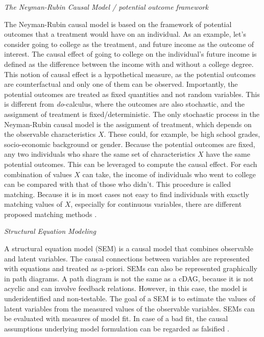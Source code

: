 \documentclass[nobib]{tufte-handout}
\newcommand{\docalc}{\emph{do}-calculus\xspace}
\begin{document}
\begin{InfoBox}
\centering
\colorbox{mygray}{
  \centering
  \begin{minipage}{1\textwidth}
    \medskip
    
    \emph{The Neyman-Rubin Causal Model / potential outcome framework}
    \medskip
    
    The Neyman-Rubin causal model is based on the framework of potential outcomes that a treatment would have on an individual. 
    As an example, let's consider going to college as the treatment, and future income as the outcome of interest. 
    The causal effect of going to college on the individual's future income is defined as the difference between the income with and without a college degree. 
    This notion of causal effect is a hypothetical measure, as the potential outcomes are counterfactual and only one of them can be observed.
    Importantly, the potential outcomes are treated as fixed quantities and not random variables.
    This is different from \docalc, where the outcomes are also stochastic, and the assignment of treatment is fixed/deterministic.
    The only stochastic process in the Neyman-Rubin causal model is the assignment of treatment, which depends on the observable characteristics $X$.
    These could, for example, be high school grades, socio-economic background or gender.
    Because the potential outcomes are fixed, any two individuals who share the same set of characteristics $X$ have the same potential outcomes. 
    This can be leveraged to compute the causal effect.
    For each combination of values $X$ can take, the income of individuals who went to college can be compared with that of those who didn't. 
    This procedure is called matching. 
    Because it is in most cases not easy to find individuals with exactly matching values of $X$, especially for continuous variables, there are different proposed matching methods \citep{sekhon2008neyman}.
   
    \medskip

    \emph{Structural Equation Modeling}
    \medskip

    A structural equation model (SEM) is a causal model that combines observable and latent variables.
    The causal connections between variables are represented with equations and treated as a-priori.
    SEMs can also be represented graphically in path diagrams.
    A path diagram is not the same as a cDAG, because it is not acyclic and can involve feedback relations. However, in this case, the model is underidentified and non-testable.
    The goal of a SEM is to estimate the values of latent variables from the measured values of the observable variables. 
    SEMs can be evaluated with measures of model fit. 
    In case of a bad fit, the causal assumptions underlying model formulation can be regarded as falsified \citep{bollen2013eight}. 


\end{minipage}}
\end{InfoBox}
\end{document}
